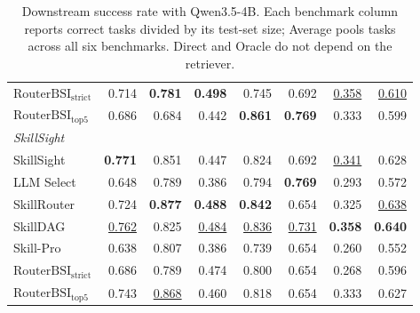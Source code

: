 \begin{table}[t]
\begin{tabular*}{\textwidth}{@{\extracolsep{\fill}}lrrrrrrr@{}}
$\mathrm{RouterBSI}_{\mathrm{strict}}$ & 0.714 & \textbf{0.781} & \textbf{0.498} & 0.745 & 0.692 & \underline{0.358} & \underline{0.610} \\
$\mathrm{RouterBSI}_{\mathrm{top}5}$ & 0.686 & 0.684 & 0.442 & \textbf{0.861} & \textbf{0.769} & 0.333 & 0.599 \\
\midrule
\multicolumn{8}{l}{\textit{SkillSight}} \\
\midrule
SkillSight & \textbf{0.771} & 0.851 & 0.447 & 0.824 & 0.692 & \underline{0.341} & 0.628 \\
LLM Select & 0.648 & 0.789 & 0.386 & 0.794 & \textbf{0.769} & 0.293 & 0.572 \\
SkillRouter & 0.724 & \textbf{0.877} & \textbf{0.488} & \textbf{0.842} & 0.654 & 0.325 & \underline{0.638} \\
SkillDAG & \underline{0.762} & 0.825 & \underline{0.484} & \underline{0.836} & \underline{0.731} & \textbf{0.358} & \textbf{0.640} \\
Skill-Pro & 0.638 & 0.807 & 0.386 & 0.739 & 0.654 & 0.260 & 0.552 \\
$\mathrm{RouterBSI}_{\mathrm{strict}}$ & 0.686 & 0.789 & 0.474 & 0.800 & 0.654 & 0.268 & 0.596 \\
$\mathrm{RouterBSI}_{\mathrm{top}5}$ & 0.743 & \underline{0.868} & 0.460 & 0.818 & 0.654 & 0.333 & 0.627 \\
\bottomrule
\end{tabular*}
\caption{Downstream success rate with Qwen3.5-4B. Each benchmark column reports correct tasks divided by its test-set size; Average pools tasks across all six benchmarks. Direct and Oracle do not depend on the retriever.}
\label{tab:app-downstream}
\end{table}
